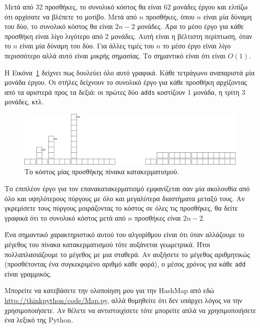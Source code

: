 \documentclass[10pt]{book}
\begin{document}
Μετά από 32 προσθήκες, το συνολικό κόστος θα είναι 62 μονάδες έργου και ελπίζω ότι αρχίσατε να βλέπετε το
μοτίβο.  Μετά από $n$ προσθήκες, όπου $n$ είναι μία δύναμη του δύο, το συνολικό κόστος θα είναι $2n-2$ μονάδες.
Άρα το μέσο έργο για κάθε προσθήκη είναι λίγο λιγότερο από 2 μονάδες. Αυτή είναι η βέλτιστη περίπτωση, όταν το $n$ είναι μία δύναμη του δύο.  Για άλλες τιμές του $n$ το μέσο έργο είναι λίγο περισσότερο αλλά αυτό είναι μικρής σημασίας.  Το σημαντικό είναι ότι είναι $O(1)$.

Η Εικόνα~\ref{fig.hash} δείχνει πως δουλεύει όλο αυτό γραφικά.  Κάθε τετράγωνο αναπαριστά μία μονάδα έργου.
Οι στήλες δείχνουν το συνολικό έργο για κάθε προσθήκη αρχίζοντας από τα αριστερά προς τα δεξιά: οι πρώτες δύο
{\tt adds} κοστίζουν 1 μονάδα, η τρίτη 3 μονάδες, κτλ. 

\begin{figure}
\centerline{\includegraphics[scale=1.0]{figs/towers.pdf}}
\caption{Το κόστος μίας προσθήκης πίνακα κατακερματισμού.} 
\label{fig.hash}
\end{figure}

Το επιπλέον έργο για τον επανακατακερματισμό εμφανίζεται σαν μία ακολουθία από όλο και υψηλότερους πύργους
με όλο και μεγαλύτερα διαστήματα μεταξύ τους.  Αν γκρεμίσετε τους πύργους μοιράζοντας το κόστος σε
όλες τις προσθήκες, θα δείτε γραφικά ότι το συνολικό κόστος μετά από $n$ προσθήκες είναι $2n - 2$.

Ένα σημαντικό χαρακτηριστικό αυτού του αλγορίθμου είναι ότι όταν αλλάζουμε το μέγεθος του πίνακα
κατακερματισμού τότε αυξάνεται γεωμετρικά. Ήτοι πολλαπλασιάζουμε το μέγεθος με μια σταθερά.  Αν αυξήσετε
το μέγεθος αριθμητικώς (προσθέτοντας ένα συγκεκριμένο αριθμό κάθε φορά), ο μέσος χρόνος για κάθε {\tt add}
είναι γραμμικός.

Μπορείτε να κατεβάσετε την υλοποίηση μου για την HashMap από εδώ \url{http://thinkpython/code/Map.py}, αλλά
θυμηθείτε ότι δεν υπάρχει λόγος να την χρησιμοποιήσετε. Αν θέλετε να αντιστοιχίσετε τότε μπορείτε απλά να χρησιμοποιήσετε ένα λεξικό της Python.
\end{document}

